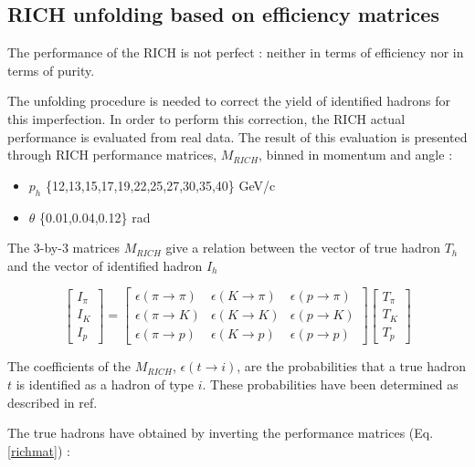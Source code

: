 \documentclass[letterpaper,12pt]{article}
\begin{document}
\subsection{RICH unfolding based on efficiency matrices}

The performance of the RICH is not perfect : neither in terms of efficiency nor in terms
of purity.

The unfolding procedure is needed to correct the yield of identified hadrons for this imperfection.
In order to perform this correction, the RICH actual performance is evaluated from real data. The result of
this evaluation is presented through RICH performance matrices, $M_{RICH}$, binned in momentum
and angle :

\begin{itemize}
  \item $p_h$ \{12,13,15,17,19,22,25,27,30,35,40\} GeV/c
  \item $\theta$ \{0.01,0.04,0.12\} rad
\end{itemize}

The 3-by-3 matrices $M_{RICH}$ give a relation between the vector of true hadron $T_h$ and the vector of
identified hadron $I_h$

\begin{equation}
\begin{bmatrix}
I_{\pi} \\
I_K \\
I_p
\end{bmatrix}
=
\begin{bmatrix}
\epsilon(\pi \rightarrow \pi) & \epsilon(K \rightarrow \pi) & \epsilon(p \rightarrow \pi)\\
\epsilon(\pi \rightarrow K) & \epsilon(K \rightarrow K) & \epsilon(p \rightarrow K) \\
\epsilon(\pi \rightarrow p) & \epsilon(K \rightarrow p) & \epsilon(p \rightarrow p)
\end{bmatrix}
\begin{bmatrix}
T_{\pi} \\
T_K \\
T_p
\end{bmatrix}
\end{equation}

The coefficients of the $M_{RICH}$, $\epsilon(t \rightarrow i)$, are the probabilities that a true hadron
$t$ is identified as a hadron of type $i$. These probabilities have been determined as described in ref\cite{RICH_NOTE}.

The true hadrons have obtained by inverting the performance matrices (Eq.\ref{richmat}) :
\end{document}
